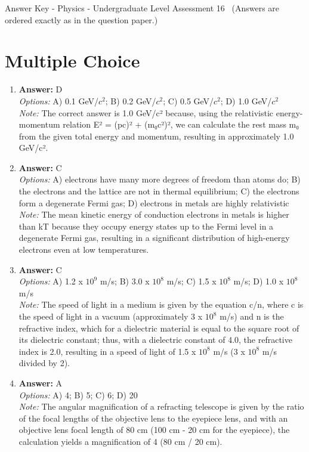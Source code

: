 \documentclass[12pt]{article}
\begin{document}
\begin{center}
Answer Key - Physics - Undergraduate Level Assessment 16 \
\small (Answers are ordered exactly as in the question paper.)
\end{center}

\section*{Multiple Choice}
\begin{enumerate}[label=\arabic*.]
\item \textbf{Answer:} D
\\ \textit{Options:} A) 0.1 GeV/$c^2$; B) 0.2 GeV/$c^2$; C) 0.5 GeV/$c^2$; D) 1.0 GeV/$c^2$
\\ \textit{Note:} The correct answer is 1.0 GeV/c² because, using the relativistic energy-momentum relation E² = (pc)² + (m₀c²)², we can calculate the rest mass m₀ from the given total energy and momentum, resulting in approximately 1.0 GeV/c².
\item \textbf{Answer:} C
\\ \textit{Options:} A) electrons have many more degrees of freedom than atoms do; B) the electrons and the lattice are not in thermal equilibrium; C) the electrons form a degenerate Fermi gas; D) electrons in metals are highly relativistic
\\ \textit{Note:} The mean kinetic energy of conduction electrons in metals is higher than kT because they occupy energy states up to the Fermi level in a degenerate Fermi gas, resulting in a significant distribution of high-energy electrons even at low temperatures.
\item \textbf{Answer:} C
\\ \textit{Options:} A) 1.2 x $10^9$ m/s; B) 3.0 x $10^8$ m/s; C) 1.5 x $10^8$ m/s; D) 1.0 x $10^8$ m/s
\\ \textit{Note:} The speed of light in a medium is given by the equation c/n, where c is the speed of light in a vacuum (approximately 3 x $10^8$ m/s) and n is the refractive index, which for a dielectric material is equal to the square root of its dielectric constant; thus, with a dielectric constant of 4.0, the refractive index is 2.0, resulting in a speed of light of 1.5 x $10^8$ m/s (3 x $10^8$ m/s divided by 2).
\item \textbf{Answer:} A
\\ \textit{Options:} A) 4; B) 5; C) 6; D) 20
\\ \textit{Note:} The angular magnification of a refracting telescope is given by the ratio of the focal lengths of the objective lens to the eyepiece lens, and with an objective lens focal length of 80 cm (100 cm - 20 cm for the eyepiece), the calculation yields a magnification of 4 (80 cm / 20 cm).

\end{enumerate}
\end{document}
